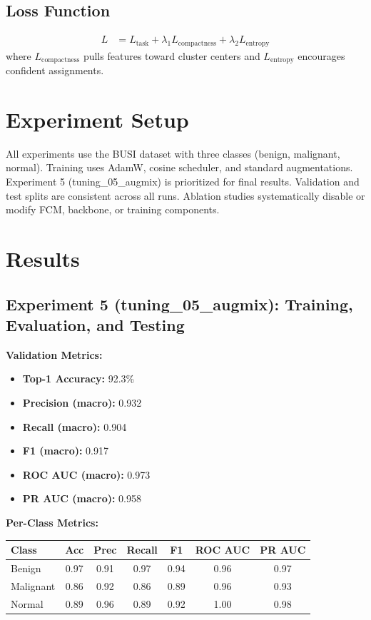 \subsection{Loss Function}
\begin{align*}
L &= L_{\text{task}} + \lambda_1 L_{\text{compactness}} + \lambda_2 L_{\text{entropy}}
\end{align*}
where $L_{\text{compactness}}$ pulls features toward cluster centers and $L_{\text{entropy}}$ encourages confident assignments.

\section{Experiment Setup}
All experiments use the BUSI dataset with three classes (benign, malignant, normal). Training uses AdamW, cosine scheduler, and standard augmentations. Experiment 5 (tuning\_05\_augmix) is prioritized for final results. Validation and test splits are consistent across all runs. Ablation studies systematically disable or modify FCM, backbone, or training components.

\section{Results}
\subsection{Experiment 5 (tuning\_05\_augmix): Training, Evaluation, and Testing}
\textbf{Validation Metrics:}
\begin{itemize}
  \item \textbf{Top-1 Accuracy:} 92.3\%
  \item \textbf{Precision (macro):} 0.932
  \item \textbf{Recall (macro):} 0.904
  \item \textbf{F1 (macro):} 0.917
  \item \textbf{ROC AUC (macro):} 0.973
  \item \textbf{PR AUC (macro):} 0.958
\end{itemize}

\textbf{Per-Class Metrics:}
\begin{tabular}{l|c|c|c|c|c|c}
Class & Acc & Prec & Recall & F1 & ROC AUC & PR AUC \\
\hline
Benign & 0.97 & 0.91 & 0.97 & 0.94 & 0.96 & 0.97 \\
Malignant & 0.86 & 0.92 & 0.86 & 0.89 & 0.96 & 0.93 \\
Normal & 0.89 & 0.96 & 0.89 & 0.92 & 1.00 & 0.98 \\
\end{tabular}

